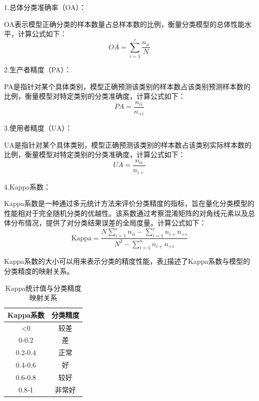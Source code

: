1.总体分类准确率（OA）：

OA表示模型正确分类的样本数量占总样本数的比例，衡量分类模型的总体性能水平，计算公式如下：
\begin{equation}
    OA=\sum_{i=1}^{c}{\frac{n_{ii}}{N}}
\end{equation}

2.生产者精度（PA）：

PA是指针对某个具体类别，模型正确预测该类别的样本数占该类别预测样本数的比例，衡量模型对特定类别的分类准确度，计算公式如下：
\begin{equation}
    PA=\frac{n_{ii}}{n_{+i}}
\end{equation}

3.使用者精度（UA）：

UA是指针对某个具体类别，模型正确预测该类别的样本数占该类别实际样本数的比例，衡量模型对特定类别的分类准确度，计算公式如下：
\begin{equation}
    UA=\frac{n_{ii}}{{n_{i+}}}
\end{equation}

4.Kappa系数：

Kappa系数是一种通过多元统计方法来评价分类精度的指标，旨在量化分类模型的性能相对于完全随机分类的优越性。该系数通过考察混淆矩阵的对角线元素以及总体分布情况，提供了对分类结果误差的全局度量。计算公式如下：
\begin{equation}
    \mathrm{Kappa}=\frac{N\sum_{i=1}^{c}{n_{ii}}-\sum_{i=1}^{c}{n_{i+}n_{+i}}}{N^2-\sum_{i=1}^{n}{n_{i+}n_{+i}}}
\end{equation}

Kappa系数的大小可以用来表示分类的精度性能，表\ref{kappa}描述了Kappa系数与模型的分类精度的映射关系。
\begin{table}[ht]
    \caption{Kappa统计值与分类精度映射关系}
    \begin{tabular}{cc}
        \toprule[1.5bp]
        Kappa系数 & 分类精度 \\
        \midrule[0.75bp]
        <0      & 较差   \\
        0-0.2   & 差    \\
        0.2-0.4 & 正常   \\
        0.4-0.6 & 好    \\
        0.6-0.8 & 较好   \\
        0.8-1   & 非常好  \\
        \bottomrule[1.5bp]
    \end{tabular}
    \label{kappa}
\end{table}

